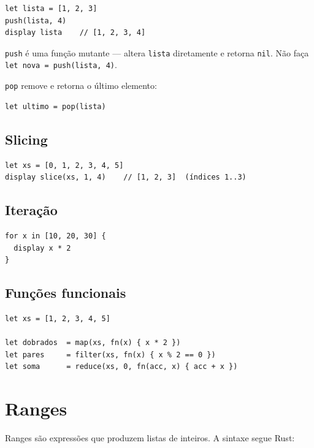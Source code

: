 \begin{lstlisting}
let lista = [1, 2, 3]
push(lista, 4)
display lista    // [1, 2, 3, 4]
\end{lstlisting}

\begin{aviso}
  \lstinline{push} é uma função mutante — altera \lstinline{lista} diretamente e
  retorna \lstinline{nil}. Não faça \lstinline{let nova = push(lista, 4)}.
\end{aviso}

\lstinline{pop} remove e retorna o último elemento:

\begin{lstlisting}
let ultimo = pop(lista)
\end{lstlisting}

\subsection{Slicing}

\begin{lstlisting}
let xs = [0, 1, 2, 3, 4, 5]
display slice(xs, 1, 4)    // [1, 2, 3]  (índices 1..3)
\end{lstlisting}

\subsection{Iteração}

\begin{lstlisting}
for x in [10, 20, 30] {
  display x * 2
}
\end{lstlisting}

\subsection{Funções funcionais}

\begin{lstlisting}
let xs = [1, 2, 3, 4, 5]

let dobrados  = map(xs, fn(x) { x * 2 })
let pares     = filter(xs, fn(x) { x % 2 == 0 })
let soma      = reduce(xs, 0, fn(acc, x) { acc + x })
\end{lstlisting}

\section{Ranges}
\label{sec:ranges}

Ranges são expressões que produzem listas de inteiros. A sintaxe segue Rust:

